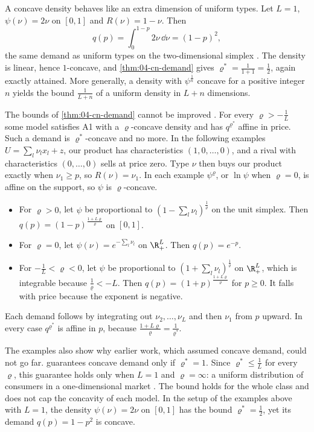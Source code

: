 A concave density behaves like an extra dimension of uniform types. Let $L = 1$, $\psi(\nu) = 2\nu$ on $[0,1]$
and $R(\nu) = 1 - \nu$. Then
\[
  q(p) = \int_0^{1 - p}2\nu\,\dd\nu = (1 - p)^2,
\]
the same demand as uniform types on the two-dimensional simplex \citep[Example 4.2]{CaplinNalebuff1991}. The
density is linear, hence $1$-concave, and \cref{thm:04-cn-demand} gives $\varrho^* = \frac{1}{1 + 1} = \frac{1}{2}$,
again exactly attained. More generally, a density with $\psi^{\frac{1}{n}}$ concave for a positive integer $n$
yields the bound $\frac{1}{L + n}$ of a uniform density in $L + n$ dimensions.

The bounds of \cref{thm:04-cn-demand} cannot be improved \citep[Proposition 2]{CaplinNalebuff1991}. For every
$\varrho > -\frac{1}{L}$ some model satisfies A1 with a $\varrho$-concave density and has $q^{\varrho^*}$ affine in price. Such a
demand is $\varrho^*$-concave and no more.
In the following examples $U = \sum_l\nu_lx_l + z$, our product has characteristics $(1, 0, \dots, 0)$, and a
rival with characteristics $(0, \dots, 0)$ sells at price zero. Type $\nu$ then buys our product exactly when
$\nu_1 \ge p$, so $R(\nu) = \nu_1$. In each example $\psi^\varrho$, or $\ln\psi$ when $\varrho = 0$, is affine on the support,
so $\psi$ is $\varrho$-concave.
\begin{itemize}
  \item For $\varrho > 0$, let $\psi$ be proportional to $(1 - \sum_l\nu_l)^{\frac{1}{\varrho}}$ on the unit simplex. Then
  $q(p) = (1 - p)^{\frac{1 + L\varrho}{\varrho}}$ on $[0, 1]$.
  \item For $\varrho = 0$, let $\psi(\nu) = e^{-\sum_l\nu_l}$ on $\R^L_+$. Then $q(p) = e^{-p}$.
  \item For $-\frac{1}{L} < \varrho < 0$, let $\psi$ be proportional to $(1 + \sum_l\nu_l)^{\frac{1}{\varrho}}$ on $\R^L_+$,
  which is integrable because $\frac{1}{\varrho} < -L$. Then $q(p) = (1 + p)^{\frac{1 + L\varrho}{\varrho}}$ for $p \ge 0$. It falls
  with price because the exponent is negative.
\end{itemize}
Each demand follows by integrating out $\nu_2, \dots, \nu_L$ and then $\nu_1$ from $p$ upward. In every case
$q^{\varrho^*}$ is affine in $p$, because $\frac{1 + L\varrho}{\varrho} = \frac{1}{\varrho^*}$.

The examples also show why earlier work, which assumed concave demand, could not go far. 
guarantees concave demand only if $\varrho^* = 1$. Since $\varrho^* \le \frac{1}{L}$ for every $\varrho$, this guarantee holds only when
$L = 1$ and $\varrho = \infty$: a uniform distribution of consumers in a one-dimensional market
\citep[p.~14]{CaplinNalebuff1991}. The bound holds for the whole class and does not cap the concavity of each
model. In the setup of the examples above with $L = 1$, the density $\psi(\nu) = 2\nu$ on $[0,1]$ has the bound
$\varrho^* = \frac{1}{2}$, yet its demand $q(p) = 1 - p^2$ is concave.

